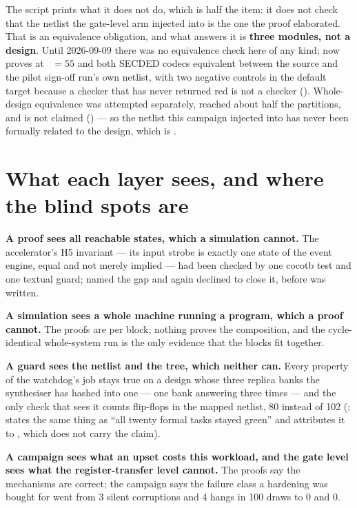 The script prints what it does not do, which is half the item: it does not check that the netlist the gate-level arm injected into is the one the proof elaborated. That is an equivalence obligation, and what answers it is \textbf{three modules, not a design}. Until 2026-09-09 there was no equivalence check here of any kind;  now proves  at ~$=55$ and both SECDED codecs equivalent between the source and the pilot sign-off run's own netlist, with two negative controls in the default target because a checker that has never returned red is not a checker (). Whole-design equivalence was attempted separately, reached about half the partitions, and is not claimed () --- so the netlist this campaign injected into has never been formally related to the design, which is .

\section{What each layer sees, and where the blind spots are}
\label{sec:verif-layers}

\textbf{A proof sees all reachable states, which a simulation cannot.} The accelerator's H5 invariant --- its input strobe is exactly one state of the event engine, equal and not merely implied --- had been checked by one cocotb test and one textual guard;  named the gap and  again declined to close it, before  was written.

\textbf{A simulation sees a whole machine running a program, which a proof cannot.} The proofs are per block; nothing proves the composition, and the cycle-identical whole-system run is the only evidence that the blocks fit together.

\textbf{A guard sees the netlist and the tree, which neither can.} Every property of the watchdog's job stays true on a design whose three replica banks the synthesiser has hashed into one --- one bank answering three times --- and the only check that sees it counts flip-flops in the mapped netlist, 80 instead of 102 (;  states the same thing as ``all twenty formal tasks stayed green'' and attributes it to , which does not carry the claim).

\textbf{A campaign sees what an upset costs this workload, and the gate level sees what the register-transfer level cannot.} The proofs say the mechanisms are correct; the campaign says the failure class a hardening was bought for went from 3 silent corruptions and 4 hangs in 100 draws to 0 and 0.

